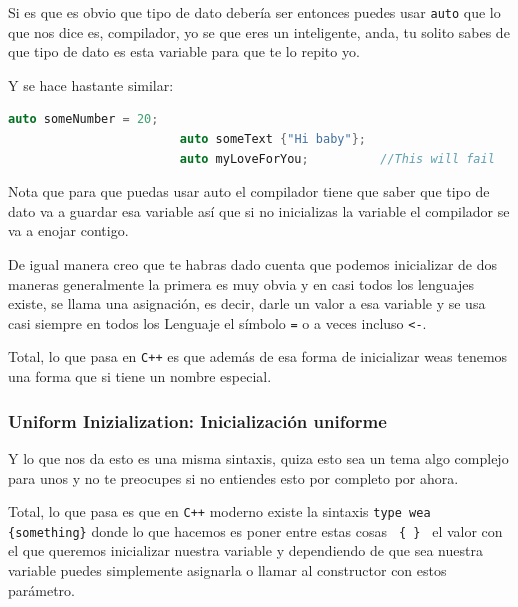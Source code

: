 \documentclass[12pt, fleqn]{report}                             %
\theoremstyle{break}                                            %
\newcommand \Cpp  {\texttt{C++} }                               %
\begin{document}
                    Si es que es obvio que tipo de dato debería ser entonces puedes usar \texttt{auto}
                    que lo que nos dice es, compilador, yo se que eres un inteligente, anda, 
                    tu solito sabes de que tipo de dato es esta variable para que te lo repito yo.
                    
                    Y se hace hastante similar:
                    \begin{lstlisting}[language=C++, gobble=24]
                        auto someNumber = 20;   
                        auto someText {"Hi baby"};
                        auto myLoveForYou;          //This will fail
                    \end{lstlisting}

                    Nota que para que puedas usar auto el compilador tiene que saber que tipo
                    de dato va a guardar esa variable así que si no inicializas la variable 
                    el compilador se va a enojar contigo.

                De igual manera creo que te habras dado cuenta que podemos inicializar de dos maneras
                generalmente la primera es muy obvia y en casi todos los lenguajes existe, se llama
                una asignación, es decir, darle un valor a esa variable y se usa casi siempre en
                todos los Lenguaje el símbolo \texttt{=} o a veces incluso \texttt{<-}.

                Total, lo que pasa en \Cpp es que además de esa forma de inicializar weas tenemos
                una forma que si tiene un nombre especial.

                \subsubsection{Uniform Inizialization: Inicialización uniforme}

                    Y lo que nos da esto es una misma sintaxis, quiza esto sea un tema algo complejo
                    para unos y no te preocupes si no entiendes esto por completo por ahora.

                    Total, lo que pasa es que en \Cpp moderno existe la sintaxis 
                    \texttt{type wea \{something\}} donde lo que hacemos es poner entre estas cosas
                    \texttt{ \{ \} } el valor con el que queremos inicializar nuestra variable y dependiendo
                    de que sea nuestra variable puedes simplemente asignarla o llamar al constructor con estos
                    parámetro.
\end{document}
